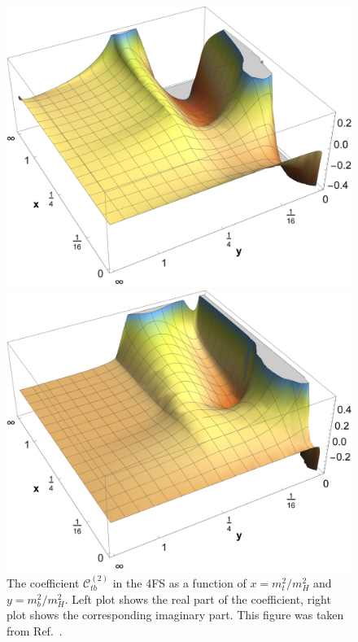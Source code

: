 \begin{figure}[ht]
\begin{minipage}{0.48\textwidth}
\centering
\includegraphics[width=\textwidth]{Images/ggH-tb_Re.pdf}
\end{minipage}
\begin{minipage}{0.48\textwidth}
\centering
\includegraphics[width=\textwidth]{Images/ggH-tb_Im.pdf}
\end{minipage}
\caption{The coefficient $\mathcal{C}_{tb}^{(2)}$ in the 4\acs{FS} as a function of $x = m_t^2/m_H^2$ and $y = m_b^2/m_H^2$. Left plot shows the real part of the coefficient, right plot shows the corresponding imaginary part. This figure was taken from Ref.~\cite{Niggetiedt:2023uyk}.}
\label{fig:5:Ctb}
\end{figure}
